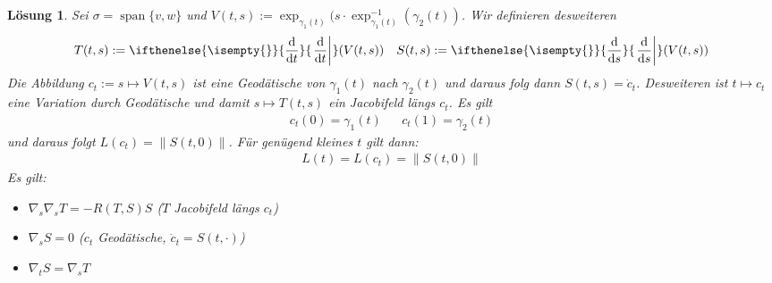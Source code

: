 \documentclass[paper=A4, twoside, chapterprefix=true, bibliography=totoc, headsepline]{scrbook}
\newcommand{\dop}{\mathrm{d}}
\newcommand{\difffrac}[3][]{\ifthenelse{\isempty{#1}}{\frac{\dop #2}{\dop #3}}{\left. \frac{\dop #2}{\dop #3} \right|_{#1}}}
\theoremstyle{plain}
\theoremstyle{nonumberplain}
\theoremstyle{empty}
\theoremstyle{break}
\newtheorem{Loes}{L\"osung}
\begin{document}
\begin{Loes}
Sei $\sigma = \mathop{\mathrm{span}}\{v,w\}$ und $V(t,s) := \exp_{\gamma_1(t)} (s \cdot \exp_{\gamma_1(t)}^{-1} (\gamma_2(t))$.
Wir definieren desweiteren
\begin{align*}
	T(t,s) := \difffrac{}{t} (V(t,s)) && S(t,s) := \difffrac{}{s} (V(t,s))
\end{align*}
Die Abbildung $c_t := s \mapsto V(t,s)$ ist eine Geod\"atische von $\gamma_1(t)$ nach $\gamma_2(t)$ und daraus folg dann $S(t,s) = \dot c_t$.
Desweiteren ist $t \mapsto c_t$ eine Variation durch Geod\"atische und damit $s \mapsto T(t,s)$ ein Jacobifeld l\"angs $c_t$.
Es gilt
\begin{align*}
	c_t(0) = \gamma_1(t) && c_t(1) = \gamma_2(t)
\end{align*}
und daraus folgt $L(c_t) = \| S(t,0) \|$. F\"ur gen\"ugend kleines $t$ gilt dann:
\begin{align*}
	L(t) = L(c_t) = \| S(t,0) \|
\end{align*}
Es gilt:\begin{itemize}
\item
	$\nabla_s \nabla_s T = -R(T,S)S$ ($T$ Jacobifeld l\"angs $c_t$)
\item
	$\nabla_s S = 0$ ($c_t$ Geod\"atische, $\dot c_t = S(t, \cdot)$)
\item
	$\nabla_t S = \nabla_s T$
\end{itemize}

\end{Loes}
\end{document}
